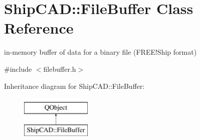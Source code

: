 \hypertarget{classShipCAD_1_1FileBuffer}{\section{Ship\-C\-A\-D\-:\-:File\-Buffer Class Reference}
\label{classShipCAD_1_1FileBuffer}
}


in-\/memory buffer of data for a binary file (F\-R\-E\-E!\-Ship format)  




{\ttfamily \#include $<$filebuffer.\-h$>$}

Inheritance diagram for Ship\-C\-A\-D\-:\-:File\-Buffer\-:\begin{figure}[H]
\begin{center}
\leavevmode
\includegraphics[height=2.000000cm]{classShipCAD_1_1FileBuffer}
\end{center}
\end{figure}
